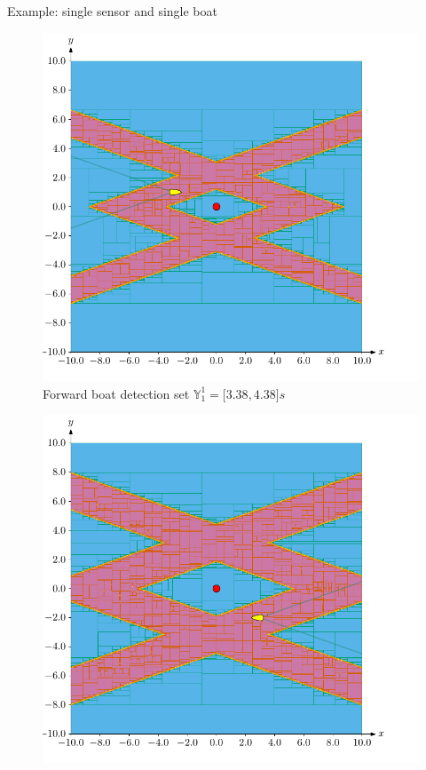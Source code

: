 \documentclass{beamer}
\begin{document}
            \begin{frame}{Example: single sensor and single boat}
                \begin{minipage}{0.45\textwidth}
                    \begin{figure}
                            \includegraphics[width=\textwidth]{imgs/forward}
                            \caption{Forward boat detection set $\mathbb{Y}_1^1 = \lbrack3.38, 4.38\rbrack s$}
                    \end{figure}
                \end{minipage}
                \hfill
                \begin{minipage}{0.45\textwidth}
                    \begin{figure}
                            \includegraphics[width=\textwidth]{imgs/backward}

\end{figure}
\end{minipage}
\end{frame}
\end{document}
